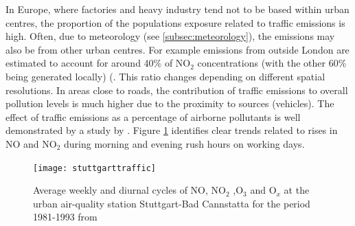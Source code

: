 
In Europe, where factories and heavy industry tend not to be based within urban centres, the proportion of the populations exposure related to traffic emissions is high. Often, due to meteorology (see \ref{subsec:meteorology}), the emissions may also be from other urban centres. For example emissions from outside London are estimated to account for around 40\% of NO$_{2}$ concentrations (with the other 60\% being generated locally) (\cite{GreaterLondonAuthorityGLA2010}. This ratio changes depending on different spatial resolutions. In areas close to roads, the contribution of traffic emissions to overall pollution levels is much higher due to the proximity to sources (vehicles). The effect of traffic emissions as a percentage of airborne pollutants is well demonstrated by a study by \cite{Mayer1999}. Figure \ref{fig:stuttgarttraffic} identifies clear trends related to rises in NO and NO$_{2}$ during morning and evening rush hours on working days.

\begin{figure}[H]
\centering
\texttt{[image: stuttgarttraffic]}
\caption{Average weekly and diurnal cycles of NO, NO$_{2}$ ,O$_{3}$ and O$_{x}$ at the urban air-quality station Stuttgart-Bad Cannstatta for the period 1981-1993 from \cite{Mayer1999}}
\label{fig:stuttgarttraffic}
\end{figure}

 

